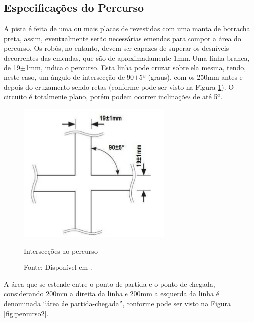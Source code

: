 \vspace{1cm}
\subsection{Especificações do Percurso} \label{cap:perc_robocore}

A pista é feita de uma ou mais placas de  revestidas com uma manta de 
borracha preta, assim, eventualmente serão necessárias emendas para compor a área do percurso. Os robôs, no entanto, 
devem ser capazes de superar os desníveis decorrentes das emendas, que são de aproximadamente 1mm.
Uma linha branca, de 19$\pm$1mm, indica o percurso. Esta linha pode cruzar sobre ela mesma, tendo, neste caso, 
um ângulo de intersecção de 90$\pm$5º (graus), com os 250mm antes e depois do cruzamento sendo retas (conforme pode 
ser visto na Figura \ref{fig:percurso1}). O circuito é totalmente plano, porém podem ocorrer 
inclinações de até 5º.\par



\begin{figure}[h!]
 \centering
 \captionsetup{width=0.37\textwidth,font=footnotesize,textfont=bf}
 \includegraphics[scale=0.6]{figuras/Percurso1.png}
 \caption{Intersecções no percurso \label{fig:percurso1}}
 \vspace{-0.7cm}
 \caption*{Fonte: Disponível em \cite[p.4]{RegrasRobocore}.}
\end{figure}






 A área que se estende entre o ponto de partida e o ponto de chegada, considerando 200mm a direita da linha e 
 200mm a esquerda da linha
 é denominada ``área de partida-chegada'', conforme pode ser visto na Figura \ref{fig:percurso2}.\par
 

